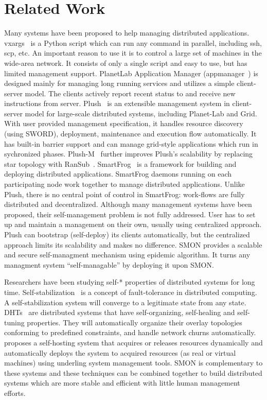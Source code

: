 \section{Related Work}
\label{sec:related}

Many systems have been proposed to help managing distributed
applications. vxargs~\cite{vxargs} is a Python script which
can run any command in parallel, including ssh, scp, etc. An
important reason to use it is to control a large set of
machines in the wide-area network. It consists of only a
single script and easy to use, but has limited management
support. PlanetLab Application Manager
(appmanager~\cite{appmanager}) is designed mainly for
managing long running services and utilizes a simple
client-server model. The clients actively report recent
status to and receive new instructions from server.
Plush~\cite{Albrecht2007} is an extensible management system
in client-server model for large-scale distributed systems,
including Planet-Lab and Grid. With user provided management
specification, it handles resource discovery (using SWORD),
deployment, maintenance and execution flow automatically. It
has built-in barrier support and can manage grid-style
applications which run in sychronized phases.
Plush-M~\cite{Topilski2008} further improves Plush's
scalability by replacing star topology with
RanSub~\cite{Kostic2003}.  SmartFrog~\cite{smartfrog} is a
framework for building and deploying distributed
applications. SmartFrog daemons running on each
participating node work together to manage distributed
applications. Unlike Plush, there is no central point of
control in SmartFrog: work-flows are fully distributed and
decentralized.  Although many management systems have been
proposed, their self-management problem is not fully
addressed.  User has to set up and maintain a management on
their own, usually using centralized approach. Plush can
bootstrap (self-deploy) its clients automatically, but the
centralized approach limits its scalability and makes no
difference.  SMON provides a scalable and secure
self-managment mechanism using epidemic algorithm. It turns
any managment system ``self-managable'' by deploying it upon
SMON.

Researchers have been studying self-* properties of
distributed systems for long time.
Self-stabilization~\cite{Dijkstra1974} is a concept of
fault-tolerance in distributed computing. A
self-stabilization system will converge to a legitimate
state from any state. DHTs~\cite{Stoica2001, Ratnasamy2001,
Rowstron2001} are distributed systems that have
self-organizing, self-healing and self-tuning properties.
They will automatically organize their overlay topologies
conforming to predefined constraints, and handle network
churns automatically. \cite{Yin2008} proposes a self-hosting
system that acquires or releases resources dynamically and
automatically deploys the system to acquired resources (as
real or virtual machines) using underling system management
tools. SMON is complementary to these systems and these
techniques can be combined together to build distributed
systems which are more stable and efficient with little
human management efforts.

